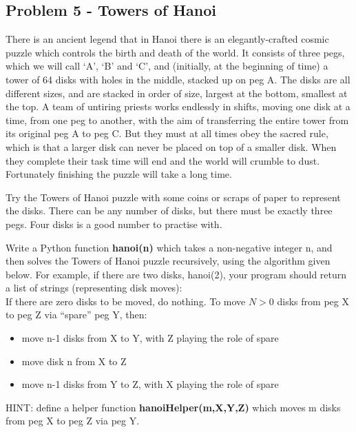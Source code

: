 \documentclass[11pt,a4paper]{report}
\begin{document}
\subsection*{Problem 5  - Towers of Hanoi}

There is an ancient legend that in Hanoi there is an elegantly-crafted cosmic puzzle
which controls the birth and death of the world. It consists of three pegs, which we
will call ‘A’, ‘B’ and ‘C’, and (initially, at the beginning of time) a tower of 64 disks
with holes in the middle, stacked up on peg A. The disks are all different sizes, and are
stacked in order of size, largest at the bottom, smallest at the top. A team of untiring
priests works endlessly in shifts, moving one disk at a time, from one peg to another,
with the aim of transferring the entire tower from its original peg A to peg C. But
they must at all times obey the sacred rule, which is that a larger disk can never be
placed on top of a smaller disk. When they complete their task time will end and the
world will crumble to dust. Fortunately finishing the puzzle will take a long time.

Try the Towers of Hanoi puzzle with some coins or scraps of paper to represent the
disks. There can be any number of disks, but there must be exactly three pegs. Four
disks is a good number to practise with.

Write a Python function \textbf{hanoi(n)} which takes a non-negative
integer n, and then solves the Towers of Hanoi puzzle recursively, using the algorithm
given below. For example, if there are two disks, hanoi(2), your program should return a list of strings (representing disk moves):
\\

If there are zero disks to be moved, do nothing. To move $N > 0$ disks from peg X
to peg Z via “spare” peg Y, then:
\begin{itemize}
 \item move n-1 disks from X to Y, with Z playing the role of spare
 \item move disk n from X to Z
 \item move n-1 disks from Y to Z, with X playing the role of spare
\end{itemize}

HINT: define a helper function \textbf{hanoiHelper(m,X,Y,Z)} which moves m disks from peg X to peg Z via peg Y.
\end{document}

